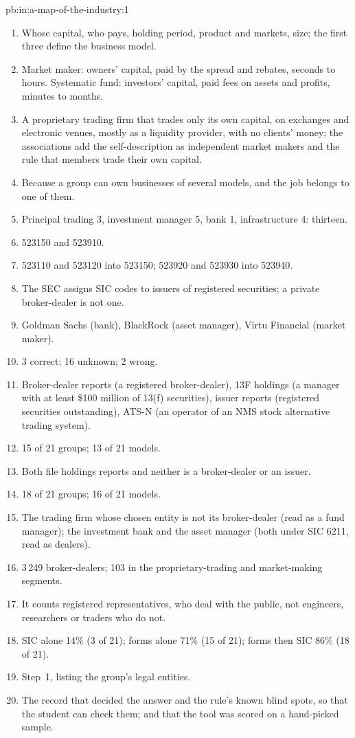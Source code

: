 \begin{solution}{pb:in:a-map-of-the-industry:1}
\begin{enumerate}
\item Whose capital, who pays, holding period, product and markets, size; the first three define the business model.
\item Market maker: owners' capital, paid by the spread and rebates, seconds to hours. Systematic fund: investors'
capital, paid fees on assets and profits, minutes to months.
\item A proprietary trading firm that trades only its own capital, on exchanges and electronic venues, mostly as a
liquidity provider, with no clients' money; the associations add the self-description as independent market makers and
the rule that members trade their own capital.
\item Because a group can own businesses of several models, and the job belongs to one of them.
\item Principal trading 3, investment manager 5, bank 1, infrastructure 4: thirteen.
\item 523150 and 523910.
\item 523110 and 523120 into 523150; 523920 and 523930 into 523940.
\item The SEC assigns SIC codes to issuers of registered securities; a private broker-dealer is not one.
\item Goldman Sachs (bank), BlackRock (asset manager), Virtu Financial (market maker).
\item 3 correct; 16 unknown; 2 wrong.
\item Broker-dealer reports (a registered broker-dealer), 13F holdings (a manager with at least \$100 million of 13(f)
securities), issuer reports (registered securities outstanding), ATS-N (an operator of an NMS stock alternative trading
system).
\item 15 of 21 groups; 13 of 21 models.
\item Both file holdings reports and neither is a broker-dealer or an issuer.
\item 18 of 21 groups; 16 of 21 models.
\item The trading firm whose chosen entity is not its broker-dealer (read as a fund manager); the investment bank and the
asset manager (both under SIC 6211, read as dealers).
\item 3\,249 broker-dealers; 103 in the proprietary-trading and market-making segments.
\item It counts registered representatives, who deal with the public, not engineers, researchers or traders who do not.
\item SIC alone 14\% (3 of 21); forms alone 71\% (15 of 21); forms then SIC 86\% (18 of 21).
\item Step~1, listing the group's legal entities.
\item The record that decided the answer and the rule's known blind spots, so that the student can check them; and that
the tool was scored on a hand-picked sample.
\end{enumerate}
\end{solution}


